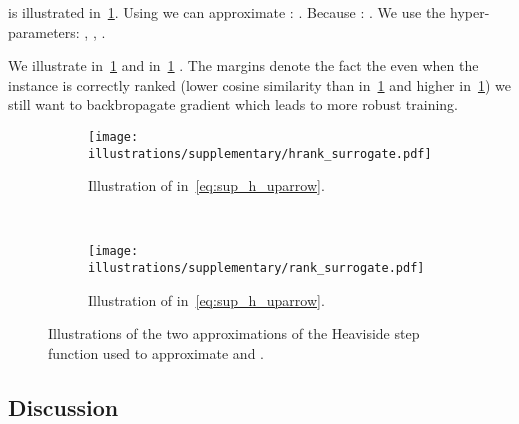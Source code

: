  is illustrated in~\cref{fig:sup_hrank_surrogate}. Using  we can approximate : . Because : . We use the hyper-parameters: , , .


\medbreak
We illustrate in~\cref{fig:sup_hrank_surrogate}  and in~\cref{fig:sup_hrank_surrogate}  \vs . The margins denote the fact the even when the instance  is correctly ranked (lower cosine similarity than  in~\cref{fig:sup_hrank_surrogate} and higher in~\cref{fig:sup_hrank_surrogate}) we still want to backbropagate gradient which leads to more robust training.
\begin{figure}[ht!]
    \centering
        
    \begin{subfigure}[t]{0.45\textwidth}
        \texttt{[image: illustrations/supplementary/hrank\_surrogate.pdf]}
        \caption{Illustration of  in~\cref{eq:sup_h_uparrow}.}
        \label{fig:sup_hrank_surrogate}
    \end{subfigure}
    ~
    \begin{subfigure}[t]{0.45\textwidth}
    \texttt{[image: illustrations/supplementary/rank\_surrogate.pdf]}
    \caption{Illustration of  in~\cref{eq:sup_h_uparrow}.}
    \label{fig:sup_rank_surrogate}
    \end{subfigure}

    \caption{Illustrations of the two approximations of the Heaviside step function used to approximate  and .}
    \label{fig:sup_surrogates}
\end{figure}

\subsection{Discussion}

